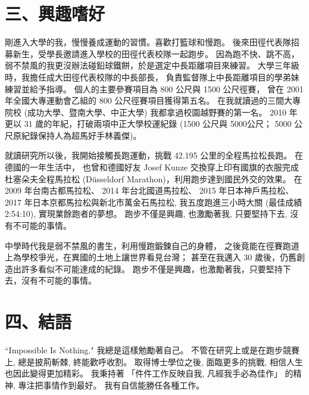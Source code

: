 \documentclass[10pt,a4paper]{article}
\begin{document}
\section*{\bf\large 三、興趣嗜好}
\label{sec:hobbies}


剛進入大學的我，慢慢養成運動的習慣。喜歡打籃球和慢跑。
後來田徑代表隊招募新生，受學長邀請進入學校的田徑代表校隊一起跑步。
因為跑不快、跳不高，弱不禁風的我更沒辦法碰鉛球鐵餅，於是選定中長距離項目來練習。
大學三年級時，我擔任成大田徑代表校隊的中長部長，
負責監督隊上中長距離項目的學弟妹練習並給予指導。
個人的主要參賽項目為 800 公尺與 1500 公尺徑賽，
曾在 2001 年全國大專運動會乙組的 800 公尺徑賽項目獲得第五名。
在我就讀過的三間大專院校 (成功大學、暨南大學、中正大學) 我都拿過校園越野賽的第一名。
2010 年更以 31 歲的年紀，打破兩項中正大學校運紀錄 (1500 公尺與 5000公尺；
5000 公尺原紀錄保持人為超馬好手林義傑)。 


就讀研究所以後，我開始接觸長跑運動，挑戰 42.195 公里的全程馬拉松長跑。
在德國的一年生活中，
也曾和德國好友 Josef Kunze 交換穿上印有國旗的衣服完成杜塞朵夫全程馬拉松 
(D\"{u}sseldorf Marathon)，利用跑步達到國民外交的效果。
在 2009 年台南古都馬拉松、 2014 年台北國道馬拉松、 2015 年日本神戶馬拉松、 
2017 年日本京都馬拉松與新北市萬金石馬拉松, 我五度跑進三小時大關 (最佳成績 2:54:10), 
實現業餘跑者的夢想。 跑步不僅是興趣, 也激勵著我, 
只要堅持下去, 沒有不可能的事情。


中學時代我是弱不禁風的書生，利用慢跑鍛鍊自己的身體，
之後竟能在徑賽跑道上為學校爭光，在異國的土地上讓世界看見台灣；
甚至在我邁入 30 歲後，仍舊創造出許多看似不可能達成的紀錄。
跑步不僅是興趣，也激勵著我，只要堅持下去，沒有不可能的事情。



\section*{\bf\large 四、結語}
\label{sec:prospection}


``Impossible Is Nothing." 我總是這樣勉勵著自己。 
不管在研究上或是在跑步競賽上, 總是披荊斬棘, 終能歡呼收割。 
取得博士學位之後, 面臨更多的挑戰, 相信人生也因此變得更加精彩。 
我秉持著 「件件工作反映自我, 凡經我手必為佳作」 的精神, 
專注把事情作到最好。 我有自信能勝任各種工作。




\begin{comment}
\section{參考文獻}
\label{sec:references}
\vspace{-1.0cm}
\begin{thebibliography}{50}


\end{thebibliography}
\end{comment}
\end{document}
